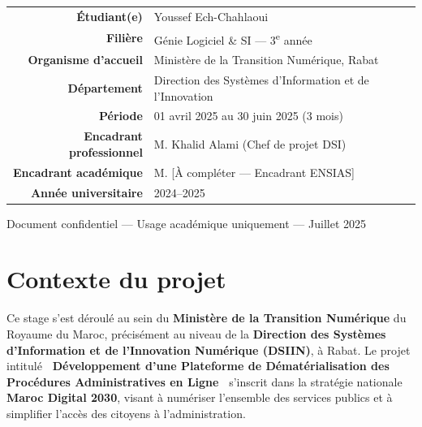 \documentclass[a4paper,11pt]{article}
\begin{document}
\begin{center}
\renewcommand{\arraystretch}{1.5}
\begin{tabular}{>{\bfseries\sffamily\color{InstitGrey}}r
                >{\color{InstitBlue}}l}
  \'{E}tudiant(e)            & Youssef Ech-Chahlaoui \\
  Fili\`{e}re                & G\'{e}nie Logiciel \& SI --- 3\textsuperscript{e} ann\'{e}e \\
  Organisme d'accueil       & Minist\`{e}re de la Transition Num\'{e}rique, Rabat \\
  D\'{e}partement             & Direction des Syst\`{e}mes d'Information et de l'Innovation \\
  P\'{e}riode                 & 01 avril 2025 au 30 juin 2025 (3 mois) \\
  Encadrant professionnel   & M. Khalid Alami (Chef de projet DSI) \\
  Encadrant acad\'{e}mique   & M. [À compléter --- Encadrant ENSIAS] \\
  Ann\'{e}e universitaire    & 2024--2025 \\
\end{tabular}
\end{center}

\vfill

\begin{center}
  {\small\color{InstitGrey}\sffamily
    Document confidentiel --- Usage acad\'{e}mique uniquement --- Juillet 2025}
\end{center}

\clearpage
\pagestyle{fancy}

\section{Contexte du projet}
\label{sec:contexte}

\begin{mdframed}[style=InfoBox]
Ce stage s'est d\'{e}roul\'{e} au sein du \textbf{Minist\`{e}re de la Transition
Num\'{e}rique} du Royaume du Maroc, pr\'{e}cis\'{e}ment au niveau de la
\textbf{Direction des Syst\`{e}mes d'Information et de l'Innovation Num\'{e}rique (DSIIN)},
\`{a} Rabat.
Le projet intitul\'{e}
\textbf{\guillemotleft~D\'{e}veloppement d'une Plateforme de D\'{e}mat\'{e}rialisation
des Proc\'{e}dures Administratives en Ligne~\guillemotright}
s'inscrit dans la strat\'{e}gie nationale \textbf{Maroc Digital 2030}, visant
\`{a} num\'{e}riser l'ensemble des services publics et \`{a} simplifier l'acc\`{e}s
des citoyens \`{a} l'administration.
\end{mdframed}
\end{document}
